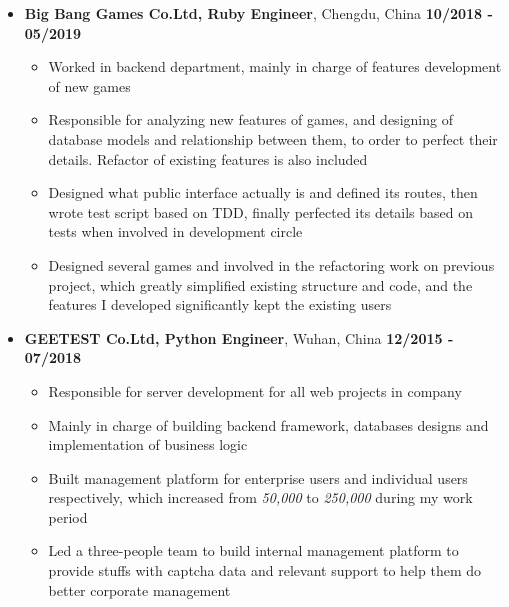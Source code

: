 \documentclass[12pt, a4paper,sans]{moderncv}       %
\begin{document}
    \begin{itemize}

        \item{\textbf{Big Bang Games Co.Ltd, Ruby Engineer}, \hfill{Chengdu, China} \hfill\textbf{10/2018 - 05/2019}}
        \vspace{2pt}
        \begin{itemize}
            \item {\medium Worked in backend department, mainly in charge of features development of new games}
            \vspace{2pt}
            \item {\medium Responsible for analyzing new features of games, and designing of database models and relationship between them, to order to perfect their details. Refactor of existing features is also included}
            \vspace{2pt}
            \item {\medium Designed what public interface actually is and defined its routes, then wrote test script based on TDD, finally perfected its details based on tests when involved in development circle}
            \vspace{2pt}
            \item {\medium Designed several games and involved in the refactoring work on previous project, which greatly simplified existing structure and code, and the features I developed significantly kept the existing users}
        \end{itemize}


        \vspace{8pt}


        \item{\textbf{GEETEST Co.Ltd, Python Engineer}, \hfill{Wuhan, China} \hfill\textbf{12/2015 - 07/2018}}
        \vspace{2pt}
        \begin{itemize}
            \item { \medium Responsible for server development for all web projects in company}
            \item { \medium Mainly in charge of building backend framework, databases designs and implementation of business logic}
            \item { \medium Built management platform for enterprise users and individual users respectively, which increased from \textit{50,000} to \textit{250,000} during my work period}
            \item { \medium Led a three-people team to build internal management platform to provide stuffs with captcha data and relevant support to help them do better corporate management}
        \end{itemize}


    \end{itemize}
\vspace{0pt}
\end{document}
